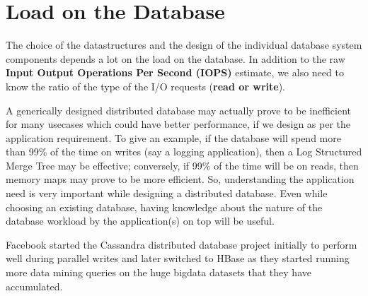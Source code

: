 \section{Load on the Database}

The choice of the datastructures and the design of the individual database system components depends a lot on the load on the database. In addition to the raw \textbf{Input Output Operations Per Second (IOPS)} estimate, we also need to know the ratio of the type of the I/O requests (\textbf{read or write}). 

A generically designed distributed database may actually prove to be inefficient for many usecases which could have better performance, if we design as per the application requirement. To give an example, if the database will spend more than 99\% of the time on writes (say a logging application), then a Log Structured Merge Tree \cite{O_Neil_1996} may be effective; conversely, if 99\% of the time will be on reads, then memory maps may prove to be more efficient. So, understanding the application need is very important while designing a distributed database. Even while choosing an existing database, having knowledge about the nature of the database workload by the application(s) on top will be useful.

Facebook started the Cassandra\cite{Lakshman_2009} distributed database project initially to perform well during parallel writes and later switched to HBase as they started running more data mining queries on the huge bigdata datasets that they have accumulated.